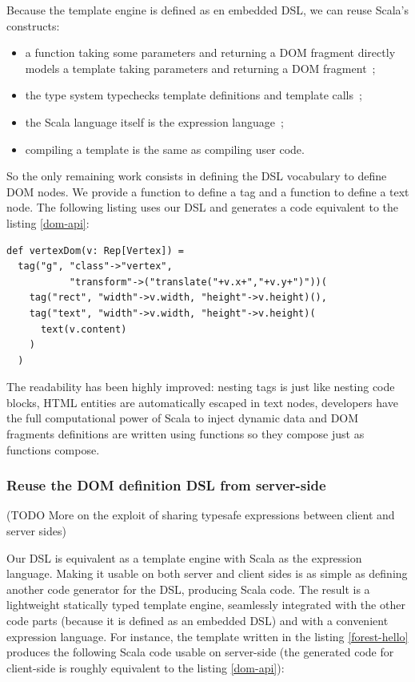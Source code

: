 \documentclass[american,english,runningheads]{llncs}
\begin{document}
Because the template engine is defined as en embedded DSL, we can reuse Scala’s constructs:

\begin{itemize}
\item a function taking some parameters and returning a DOM fragment directly models a template taking parameters and returning a DOM fragment~;
\item the type system typechecks template definitions and template calls~;
\item the Scala language itself is the expression language~;
\item compiling a template is the same as compiling user code.
\end{itemize}

So the only remaining work consists in defining the DSL vocabulary to define DOM nodes. We provide a  function to define a tag and a  function to define a text node. The following listing uses our DSL and generates a code equivalent to the listing \ref{dom-api}:

\begin{lstlisting}[label=forest-hello,caption=DOM definition DSL]
def vertexDom(v: Rep[Vertex]) =
  tag("g", "class"->"vertex",
           "transform"->("translate("+v.x+","+v.y+")"))(
    tag("rect", "width"->v.width, "height"->v.height)(),
    tag("text", "width"->v.width, "height"->v.height)(
      text(v.content)
    )
  )
\end{lstlisting}

The readability has been highly improved: nesting tags is just like nesting code blocks, HTML entities are automatically escaped in text nodes, developers have the full computational power of Scala to inject dynamic data and DOM fragments definitions are written using functions so they compose just as functions compose.

\subsubsection{Reuse the DOM definition DSL from server-side}

(TODO More on the exploit of sharing typesafe expressions between client and server sides)

Our DSL is equivalent as a template engine with Scala as the expression language. Making it usable on both server and client sides is as simple as defining another code generator for the DSL, producing Scala code. The result is a lightweight statically typed template engine, seamlessly integrated with the other code parts (because it is defined as an embedded DSL) and with a convenient expression language. For instance, the template written in the listing \ref{forest-hello} produces the following Scala code usable on server-side (the generated code for client-side is roughly equivalent to the listing \ref{dom-api}):
\end{document}
